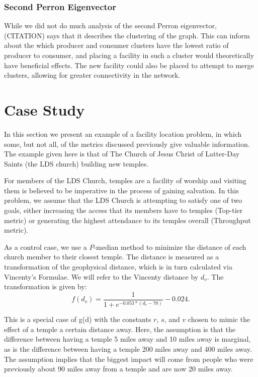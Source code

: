 \documentclass[twoside,twocolumn]{article}
\begin{document}
\subsubsection{Second Perron Eigenvector}
While we did not do much analysis of the second Perron eigenvector, (CITATION) says that it describes the clustering of the graph.
This can inform about the which producer and consumer clusters have the lowest ratio of producer to consumer, and placing a facility in such a cluster would theoretically have beneficial effects.
The new facility could also be placed to attempt to merge clusters, allowing for greater connectivity in the network.

\section{Case Study}

In this section we present an example of a facility location problem, in which some, but not all, of the metrics discussed previously give valuable information. 
The example given here is that of The Church of Jesus Christ of Latter-Day Saints (the LDS church) building new temples.


For members of the LDS Church, temples are a facility of worship and visiting them is believed to be imperative in the process of gaining salvation.
In this problem, we assume that the LDS Church is attempting to satisfy one of two goals, either increasing the access that its members have to temples (Top-tier metric) or generating the highest attendance to its temples overall (Throughput metric).

As a control case, we use a $P$-median method to minimize the distance of each church member to their closest temple.
The distance is measured as a transformation of the geophysical distance, which is in turn calculated via Vincenty's Formulae. %
We will refer to the Vincenty distance by $d_{v}$. %
The transformation is given by:
\begin{equation}
f(d_{v}) = \frac{1}{1+e^{-0.053*(d_{v} - 70)}} - 0.024.
\end{equation}

This is a special case of g(d) with the constants $r$, $s$, and $v$ chosen to mimic the effect of a temple a certain distance away.
Here, the assumption is that the difference between having a temple 5 miles away and 10 miles away is marginal, as is the difference between having a temple 200 miles away and 400 miles away.
The assumption implies that the biggest impact will come from people who were previously about 90 miles away from a temple and are now 20 miles away.
\end{document}
